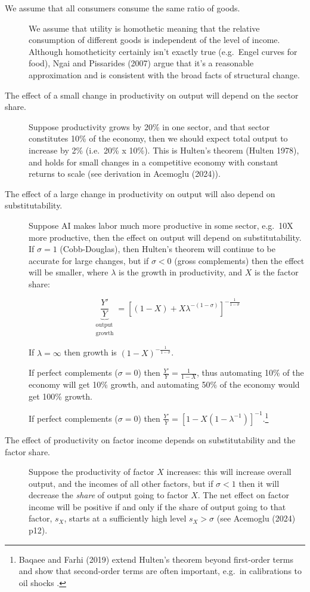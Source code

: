 \documentclass[
  11pt,
  letterpaper,
  DIV=11,
  numbers=noendperiod,
  oneside]{scrartcl}
\newcommand{\utt}[3]{\underbrace{#1}_{\substack{\text{#2}\\\text{#3}}}}
\begin{document}
\begin{description}
\item[We assume that all consumers consume the same ratio of goods.]
We assume that utility is homothetic meaning that the relative
consumption of different goods is independent of the level of income.
Although homotheticity certainly isn't exactly true (e.g.~Engel curves
for food), Ngai and Pissarides (2007) argue that it's a reasonable
approximation and is consistent with the broad facts of structural
change.
\item[The effect of a small change in productivity on output will depend
on the sector share.]
Suppose productivity grows by 20\% in one sector, and that sector
constitutes 10\% of the economy, then we should expect total output to
increase by 2\% (i.e.~20\% x 10\%). This is Hulten's theorem (Hulten
1978), and holds for small changes in a competitive economy with
constant returns to scale (see derivation in Acemoglu (2024)).
\item[The effect of a large change in productivity on output will also
depend on substitutability.]
Suppose AI makes labor much more productive in some sector, e.g.~10X
more productive, then the effect on output will depend on
substitutability. If \(\sigma=1\) (Cobb-Douglas), then Hulten's theorem
will continue to be accurate for large changes, but if \(\sigma<0\)
(gross complements) then the effect will be smaller, where \(\lambda\)
is the growth in productivity, and \(X\) is the factor share:

\[\utt{\frac{Y'}{Y}}{output}{growth}=[(1-X)+ X \lambda^{-(1-\sigma)} ]^{-\frac{1}{1-\sigma}}\]

If \(\lambda=\infty\) then growth is \((1-X)^{-\frac{1}{1-\sigma}}\).

If perfect complements (\(\sigma=0\)) then
\(\frac{Y'}{Y}=\frac{1}{1-X}\), thus automating 10\% of the economy will
get 10\% growth, and automating 50\% of the economy would get 100\%
growth.

If perfect complements (\(\sigma=0\)) then
\(\frac{Y'}{Y}=[1-X(1-\lambda^{-1})]^{-1}\).\footnote{Baqaee and Farhi
  (2019) extend Hulten's theorem beyond first-order terms and show that
  second-order terms are often important, e.g.~in calibrations to oil
  shocks .}
\item[The effect of productivity on factor income depends on
substitutability and the factor share.]
Suppose the productivity of factor \(X\) increases: this will increase
overall output, and the incomes of all other factors, but if
\(\sigma<1\) then it will decrease the \emph{share} of output going to
factor \(X\). The net effect on factor income will be positive if and
only if the share of output going to that factor, \(s_X\), starts at a
sufficiently high level \(s_X>\sigma\) (see Acemoglu (2024) p12).
\end{description}
\end{document}
